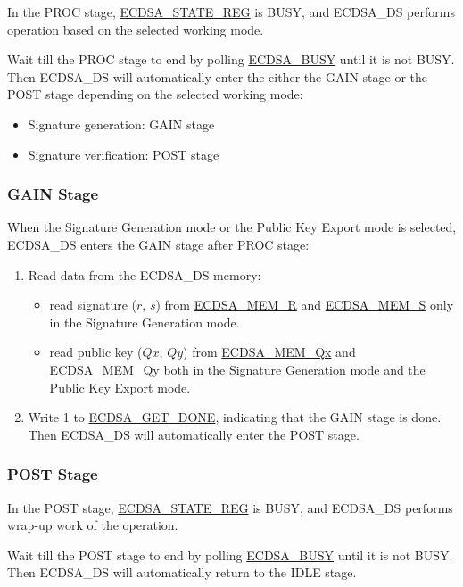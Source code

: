 \documentclass[main\_\_EN.tex]{subfiles}
\begin{document}
In the PROC stage, \hyperref[regdesc:ECDSASTATEREG]{ECDSA\_STATE\_REG} is BUSY, and ECDSA\_DS performs operation based on the selected working mode.

Wait till the PROC stage to end by polling \hyperref[fielddesc:ECDSABUSY]{ECDSA\_BUSY} until it is not BUSY. Then ECDSA\_DS will automatically enter the either the GAIN stage or the POST stage depending on the selected working mode:
\begin{itemize}
    \item Signature generation: GAIN stage
    \item Signature verification: POST stage
\end{itemize}

\subsubsection{GAIN Stage}

When the Signature Generation mode or the Public Key Export mode is selected, ECDSA\_DS enters the GAIN stage after PROC stage:

\begin{enumerate}
	\item Read data from the ECDSA\_DS memory:
	      \begin{itemize}
		      \item read signature ($r$, $s$) from \hyperref[tab:ecdsa-memory]{ECDSA\_MEM\_R} and \hyperref[tab:ecdsa-memory]{ECDSA\_MEM\_S} only in the Signature Generation mode.
		      \item read public key ($Qx$, $Qy$) from \hyperref[tab:ecdsa-memory]{ECDSA\_MEM\_Qx} and \hyperref[tab:ecdsa-memory]{ECDSA\_MEM\_Qy} both in the Signature Generation mode and the Public Key Export mode.
	      \end{itemize}
	\item Write 1 to \hyperref[fielddesc:ECDSAGETDONE]{ECDSA\_GET\_DONE}, indicating that the GAIN stage is done. Then ECDSA\_DS will automatically enter the POST stage.
\end{enumerate}

\subsubsection{POST Stage}

In the POST stage, \hyperref[regdesc:ECDSASTATEREG]{ECDSA\_STATE\_REG} is BUSY, and ECDSA\_DS performs wrap-up work of the operation.

Wait till the POST stage to end by polling \hyperref[fielddesc:ECDSABUSY]{ECDSA\_BUSY} until it is not BUSY. Then ECDSA\_DS will automatically return to the IDLE stage.
\end{document}
